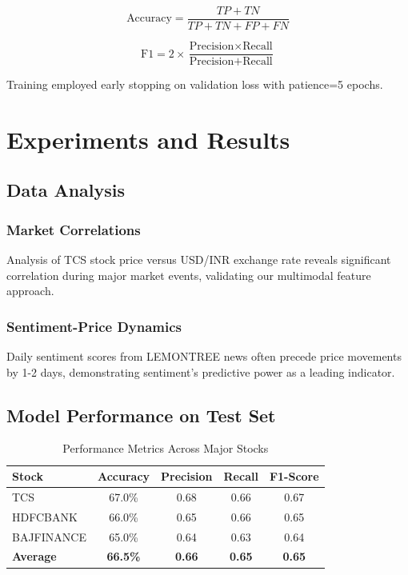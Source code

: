 \documentclass[conference]{IEEEtran}
\begin{document}
\begin{equation}
\text{Accuracy} = \frac{TP + TN}{TP + TN + FP + FN}
\end{equation}

\begin{equation}
\text{F1} = 2 \times \frac{\text{Precision} \times \text{Recall}}{\text{Precision} + \text{Recall}}
\end{equation}

Training employed early stopping on validation loss with patience=5 epochs.

\section{Experiments and Results}
\label{sec:experiments}

\subsection{Data Analysis}

\subsubsection{Market Correlations}

Analysis of TCS stock price versus USD/INR exchange rate reveals significant correlation during major market events, validating our multimodal feature approach.

\subsubsection{Sentiment-Price Dynamics}

Daily sentiment scores from LEMONTREE news often precede price movements by 1-2 days, demonstrating sentiment's predictive power as a leading indicator.

\subsection{Model Performance on Test Set}

\begin{table}[!h]
\centering
\begin{tabular}{lcccc}
\toprule
\textbf{Stock} & \textbf{Accuracy} & \textbf{Precision} & \textbf{Recall} & \textbf{F1-Score} \\
\midrule
TCS & 67.0\% & 0.68 & 0.66 & 0.67 \\
HDFCBANK & 66.0\% & 0.65 & 0.66 & 0.65 \\
BAJFINANCE & 65.0\% & 0.64 & 0.63 & 0.64 \\
\midrule
\textbf{Average} & \textbf{66.5\%} & \textbf{0.66} & \textbf{0.65} & \textbf{0.65} \\
\bottomrule
\end{tabular}
\caption{Performance Metrics Across Major Stocks}
\label{tab:results}
\end{table}
\end{document}
